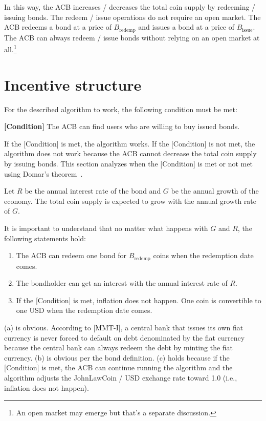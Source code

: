 \documentclass[dvipdfmx,a4paper]{article}
\begin{document}
In this way, the ACB increases / decreases the total coin supply by redeeming / issuing bonds. The redeem / issue operations do not require an open market. The ACB redeems a bond at a price of $B_{\mathrm{redemp}}$ and issues a bond at a price of $B_{\mathrm{issue}}$. The ACB can always redeem / issue bonds without relying on an open market at all.\footnote{An open market may emerge but that's a separate discussion.}

\section{Incentive structure}

For the described algorithm to work, the following condition must be met:

\begin{description}
\item{\textbf{[Condition]}} The ACB can find users who are willing to buy issued bonds.
\end{description}

If the [Condition] is met, the algorithm works. If the [Condition] is not met, the algorithm does not work because the ACB cannot decrease the total coin supply by issuing bonds. This section analyzes when the [Condition] is met or not met using Domar's theorem~\cite{domar1944burden}.

Let $R$ be the annual interest rate of the bond and $G$ be the annual growth of the economy. The total coin supply is expected to grow with the annual growth rate of $G$. 

It is important to understand that no matter what happens with $G$ and $R$, the following statements hold:

\begin{enumerate}
\renewcommand{\labelenumi}{(\alph{enumi})}
\item The ACB can redeem one bond for $B_{\mathrm{redemp}}$ coins when the redemption date comes.
\item The bondholder can get an interest with the annual interest rate of $R$.
\item If the [Condition] is met, inflation does not happen. One coin is convertible to one USD when the redemption date comes.
\end{enumerate}

(a) is obvious. According to [MMT-I], a central bank that issues its own fiat currency is never forced to default on debt denominated by the fiat currency because the central bank can always redeem the debt by minting the fiat currency. (b) is obvious per the bond definition. (c) holds because if the [Condition] is met, the ACB can continue running the algorithm and the algorithm adjusts the JohnLawCoin / USD exchange rate toward 1.0 (i.e., inflation does not happen).
\end{document}
